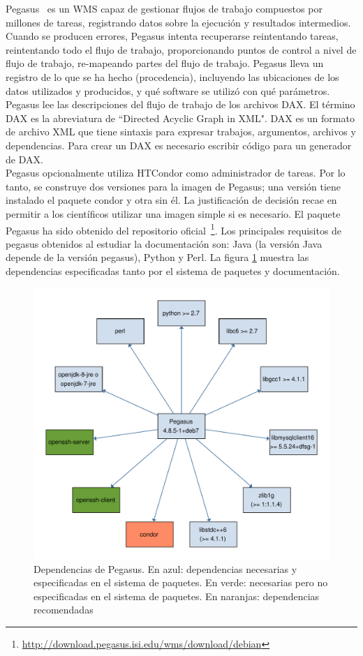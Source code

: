 Pegasus~\cite{DBLP:journals/fgcs/DeelmanVJRCMMCS15} es un WMS capaz de gestionar flujos de trabajo compuestos por millones de tareas, registrando datos sobre la ejecución y resultados intermedios. 
Cuando se producen errores, Pegasus intenta recuperarse reintentando tareas, reintentando todo el flujo de trabajo, proporcionando puntos de control a nivel de flujo de trabajo, re-mapeando partes del flujo de trabajo. Pegasus lleva un registro de lo que se ha hecho (procedencia), incluyendo las ubicaciones de los datos utilizados y producidos, y qué software se utilizó con qué parámetros.
Pegasus lee las descripciones del flujo de trabajo de los archivos DAX. El término DAX es la abreviatura de ``Directed Acyclic Graph in XML". DAX es un formato de archivo XML que tiene sintaxis para expresar trabajos, argumentos, archivos y dependencias. Para crear un DAX es necesario escribir código para un generador de DAX.\\
Pegasus opcionalmente utiliza HTCondor como administrador de tareas. Por lo tanto, se construye dos versiones para la imagen de Pegasus; una versión tiene instalado el paquete condor y otra sin él. La justificación de decisión recae en permitir a los científicos utilizar una imagen simple si es necesario.
El paquete Pegasus ha sido obtenido del repositorio oficial~\footnote{\url{http://download.pegasus.isi.edu/wms/download/debian}}.
Los principales requisitos de pegasus obtenidos al estudiar la documentación son: Java (la versión Java depende de la versión pegasus), Python y Perl. La figura \ref{fig:pegasus-deps} muestra las dependencias especificadas tanto por el sistema de paquetes y documentación.

\begin{figure}[t]
\centering
\includegraphics[width=.5\textwidth]{Figures/pegasus-deps}
\caption[Dependencias Pegasus]{Dependencias de Pegasus. En azul: dependencias necesarias y especificadas en el sistema de paquetes. En verde: necesarias pero no especificadas en el sistema de paquetes. En naranjas: dependencias recomendadas}
\label{fig:pegasus-deps}
\end{figure}

